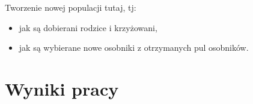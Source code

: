 \documentclass{article}
\begin{document}
Tworzenie nowej populacji tutaj, tj:
\begin{itemize}
    \item jak są dobierani rodzice i krzyżowani,
    \item jak są wybierane nowe osobniki z otrzymanych pul osobników.
\end{itemize}

\section{Wyniki pracy}
\end{document}
